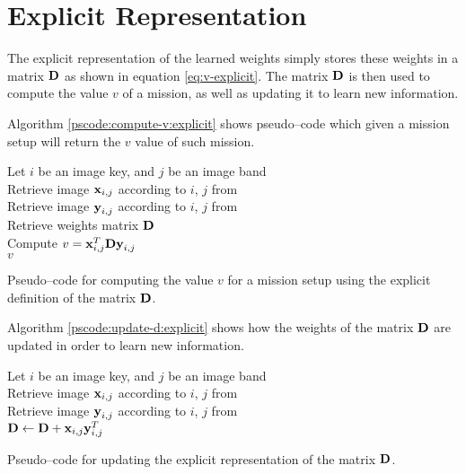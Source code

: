 \section{Explicit Representation} \label{sect:meth:explicit}

The explicit representation of the learned weights simply stores these weights in a matrix $\boldsymbol{\mathbf{D}}$ as shown in equation \ref{eq:v-explicit}. The matrix $\boldsymbol{\mathbf{D}}$ is then used to compute the value $v$ of a mission, as well as updating it to learn new information. \newline

Algorithm \ref{pscode:compute-v:explicit} shows pseudo--code which given a mission setup will return the $v$ value of such mission.

\vspace{0.4cm}
\begin{algorithm}[H]
    \SetAlgoLined
         {
            Let $i$ be an image key, and $j$ be an image band \\
            Retrieve image $\boldsymbol{\mathbf{x}}_{i,j}$ according to $i$, $j$ from \usno \\
            Retrieve image $\boldsymbol{\mathbf{y}}_{i,j}$ according to $i$, $j$ from \panstarrs \\
            Retrieve weights matrix $\boldsymbol{\mathbf{D}}$ \\
            Compute $v = \boldsymbol{\mathbf{x}}_{i,j}^T \boldsymbol{\mathbf{D}} \boldsymbol{\mathbf{y}}_{i,j}$ \\
            \Return $v$
        }
    \caption{Pseudo--code for computing the value $v$ for a mission setup using the explicit definition of the matrix $\boldsymbol{\mathbf{D}}$.}
    \label{pscode:compute-v:explicit}
\end{algorithm}
\vspace{0.4cm}

Algorithm \ref{pscode:update-d:explicit} shows how the weights of the matrix $\boldsymbol{\mathbf{D}}$ are updated in order to learn new information.

\vspace{0.4cm}
\begin{algorithm}[H]
    \SetAlgoLined
         {
            Let $i$ be an image key, and $j$ be an image band \\
            Retrieve image $\boldsymbol{\mathbf{x}}_{i,j}$ according to $i$, $j$ from \usno \\
            Retrieve image $\boldsymbol{\mathbf{y}}_{i,j}$ according to $i$, $j$ from \panstarrs \\
            $\boldsymbol{\mathbf{D}} \gets \boldsymbol{\mathbf{D}} + \boldsymbol{\mathbf{x}}_{i,j}\boldsymbol{\mathbf{y}}_{i,j}^T$ \\
        }
    \caption{Pseudo--code for updating the explicit representation of the matrix $\boldsymbol{\mathbf{D}}$.}
    \label{pscode:update-d:explicit}
\end{algorithm}
\vspace{0.4cm}

